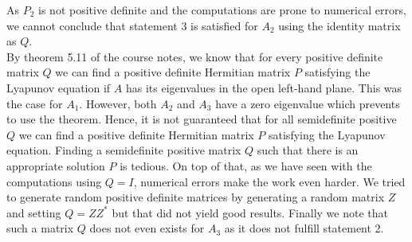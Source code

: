\documentclass[11pt]{article}
\begin{document}
As $P_2$ is not positive definite and the computations are prone to numerical errors, we cannot conclude that statement 3 is satisfied for $A_2$ using the identity matrix as $Q$.\\
By theorem 5.11 of the course notes, we know that for every positive definite matrix $Q$ we can find a positive definite Hermitian matrix $P$ satisfying the Lyapunov equation if $A$ has its eigenvalues in the open left-hand plane. This was the case for $A_1$. However, both $A_2$ and $A_3$ have a zero eigenvalue which prevents to use the theorem. Hence, it is not guaranteed that for all semidefinite positive $Q$ we can find a positive definite Hermitian matrix $P$ satisfying the Lyapunov equation. Finding a semidefinite positive matrix $Q$ such that there is an appropriate solution $P$ is tedious. On top of that, as we have seen with the computations using $Q=I$, numerical errors make the work even harder. We tried to generate random positive definite matrices by generating a random matrix $Z$ and setting $Q=ZZ^*$ but that did not yield good results. Finally we note that such a matrix $Q$ does not even exists for $A_3$ as it does not fulfill statement 2.
\end{document}

